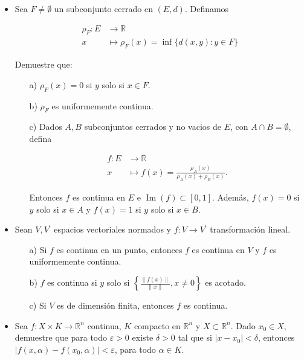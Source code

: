 \begin{itemize}
\item Sea $F \neq \emptyset$ un subconjunto cerrado en $(E, d)$. Definamos

$$
\begin{aligned}
\rho_F: E & \rightarrow \mathbb{R} \\
x & \mapsto \rho_F(x)=\inf \{d(x, y): y \in F\}
\end{aligned}
$$

Demuestre que:

\begin{itemize}
    \item [a)] $\rho_F(x)=0$ si $y$ solo si $x \in F$.

    \item[b)] $\rho_F$ es uniformemente continua.

    \item[c)] Dados $A, B$ subconjuntos cerrados y no vacios de $E$, con $A \cap B=\emptyset$, defina

$$
\begin{aligned}
f: E & \rightarrow \mathbb{R} \\
x & \mapsto f(x)=\frac{\rho_A(x)}{\rho_A(x)+\rho_B(x)} .
\end{aligned}
$$

Entonces $f$ es continua en $E$ e $\operatorname{Im}(f) \subset[0,1]$. Además, $f(x)=0$ si $y$ solo si $x \in A$ y $f(x)=1$ si $y$ solo si $x \in B$.
\end{itemize}

\item Sean $V, V^{\prime}$ espacios vectoriales normados y $f: V \rightarrow V^{\prime}$ transformación lineal.

\begin{itemize}
    \item [a)] Si $f$ es continua en un punto, entonces $f$ es continua en $V$ y $f$ es uniformemente continua.

    \item[b)] $f$ es continua si $y$ solo si $\left\{\frac{\|f(x)\|}{\|x\|}, x \neq 0\right\}$ es acotado.
    
    \item[c)] Si $V$ es de dimensión finita, entonces $f$ es continua.
\end{itemize}

\item Sea $f: X \times K \rightarrow \mathbb{R}^n$ continua, $K$ compacto en $\mathbb{R}^n$ y $X \subset \mathbb{R}^n$. Dado $x_0 \in X$, demuestre que para todo $\varepsilon>0$ existe $\delta>0$ tal que si $\left|x-x_0\right|<\delta$, entonces $\left|f(x, \alpha)-f\left(x_0, \alpha\right)\right|<\varepsilon$, para todo $\alpha \in K$.


\end{itemize}
